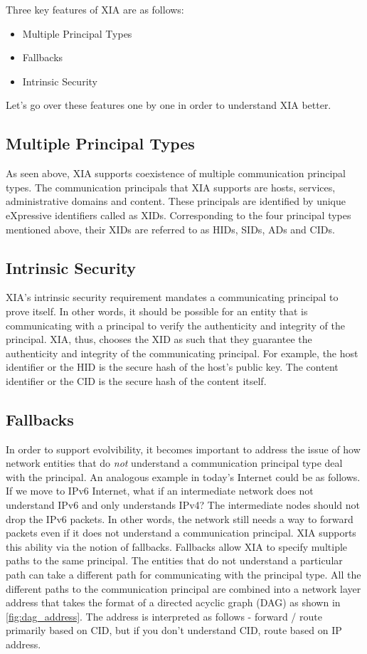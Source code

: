 Three key features of XIA are as follows:
\begin{itemize}
\item{Multiple Principal Types}
\item{Fallbacks}
\item{Intrinsic Security}
\end{itemize}
Let's go over these features one by one in order to understand XIA
better.
\subsection{Multiple Principal Types}
As seen above, XIA supports coexistence of multiple communication
principal types. The communication principals that XIA supports are
hosts, services, administrative domains and content. These principals
are identified by unique eXpressive identifiers called as
XIDs. Corresponding to the four principal types mentioned above, their
XIDs are referred to as HIDs, SIDs, ADs and CIDs.

\subsection{Intrinsic Security}
XIA's intrinsic security requirement mandates a communicating
principal to prove itself. In other words, it should be possible for
an entity that is communicating with a principal to verify the
authenticity and integrity of the principal. XIA, thus, chooses the
XID as such that they guarantee the authenticity and integrity of the
communicating principal. For example, the host identifier or the HID
is the secure hash of the host's public key. The content identifier or
the CID is the secure hash of the content itself.

\subsection{Fallbacks}
In order to support evolvibility, it becomes important to address the
issue of how network entities that do \emph{not} understand a
communication principal type deal with the principal. An analogous
example in today's Internet could be as follows. If we move to IPv6
Internet, what if an intermediate network does not understand IPv6 and
only understands IPv4? The intermediate nodes should not drop the IPv6
packets. In other words, the network still needs a way to forward
packets even if it does not understand a communication principal. XIA
supports this ability via the notion of fallbacks. Fallbacks allow XIA
to specify multiple paths to the same principal. The entities that do
not understand a particular path can take a different path for
communicating with the principal type. All the different paths to the
communication principal are combined into a network layer address that
takes the format of a directed acyclic graph (DAG) as shown in
\ref{fig:dag_address}. The address is interpreted as follows - forward
/ route primarily based on CID, but if you don't understand CID, route
based on IP address.

